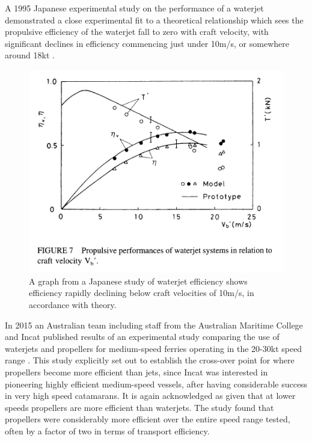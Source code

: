 \documentclass{article}\usepackage[]{graphicx}\usepackage[]{color}
\begin{document}
A 1995 Japanese experimental study on the performance of a waterjet demonstrated a close experimental fit to a theoretical relationship which sees the propulsive efficiency of the waterjet fall to zero with craft velocity, with significant declines in efficiency commencing just under 10m/s, or somewhere around 18kt \parencite{fujisawa1995}.

\begin{figure}
\includegraphics[width=\textwidth]{EfficiencyJapan.png}
\caption{A graph from a Japanese study of waterjet efficiency shows efficiency rapidly declining below craft velocities of 10m/s, in accordance with theory. \parencite{fujisawa1995}}
\label{fig:EfficiencyJapan.png}
\end{figure}

In 2015 an Australian team including staff from the Australian Maritime College and Incat published results of an experimental study comparing the use of waterjets and propellers for medium-speed ferries operating in the 20-30kt speed range \parencite{kamal2015}.  This study explicitly set out to establish the cross-over point for where propellers become more efficient than jets, since Incat was interested in pioneering highly efficient medium-speed vessels, after having considerable success in very high speed catamarans.  It is again acknowledged as given that at lower speeds propellers are more efficient than waterjets.  The study found that propellers were considerably more efficient over the entire speed range tested, often by a factor of two in terms of transport efficiency.
\end{document}
